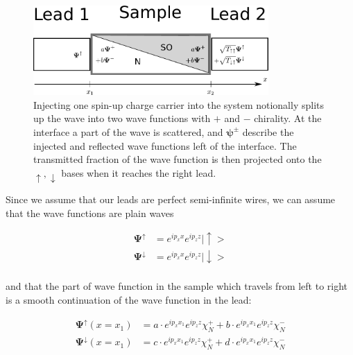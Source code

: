 \begin{figure}
    \begin{center}
    \includegraphics[width=0.8\textwidth]{adapting-pic.pdf}
    \end{center}
    \caption{Injecting one spin-up charge carrier into the system notionally
        splits up the wave into two wave functions with $+$ and $-$ chirality.
        At the interface a part of the wave is scattered, and
        $\mathbf{\psi^\pm}$
        describe the injected and reflected wave functions left of the
        interface. The transmitted fraction of the wave function is then
        projected onto the $\uparrow,\downarrow$ bases when it reaches the right
        lead.}
\end{figure}


Since we assume that our leads are perfect semi-infinite wires, we can assume
that the wave functions are plain waves

\begin{align*}
    \mathbf{\Psi^\uparrow}   &=  e^{i p_x x} e^{i p_z z} |\uparrow> \\
    \mathbf{\Psi^\downarrow} &=  e^{i p_x x} e^{i p_z z} |\downarrow> \\
\end{align*}

and that the part of wave function in the sample which travels from left to
right is a smooth continuation of the wave function in the lead:

\begin{align}
    \mathbf{\Psi^\uparrow}(x=x_1) &=
        a\cdot e^{i p_x x_1}e^{i p_z z} \chi_N^+
        + b\cdot e^{i p_x x_1}e^{i p_z z} \chi_N^-\nonumber\\
    \mathbf{\Psi^\downarrow}(x=x_1) &=
        c\cdot e^{i p_x x_1}e^{i p_z z} \chi_N^+
        + d\cdot e^{i p_x x_1}e^{i p_z z} \chi_N^-
        \label{eq:a-n-left}
\end{align}

